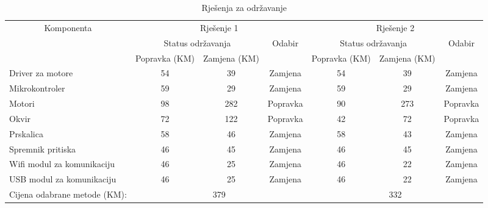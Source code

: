 \documentclass[12pt]{article}
\begin{document}
\begin{landscape}
\begin{table}[htbp]
  \centering
  \footnotesize
  \caption{Rješenja za održavanje}
    \begin{tabular}{lcccccc}
    \toprule
    \multicolumn{1}{c}{\multirow{3}[6]{*}{Komponenta}} & \multicolumn{3}{c}{Rješenje 1} & \multicolumn{3}{c}{Rješenje 2} \\
\cmidrule{2-7}          & \multicolumn{2}{c}{Status održavanja} & \multirow{2}[4]{*}{Odabir} & \multicolumn{2}{c}{Status održavanja} & \multirow{2}[4]{*}{Odabir} \\
\cmidrule{2-3}\cmidrule{5-6}          & Popravka (KM) & Zamjena (KM) &       & Popravka (KM) & Zamjena (KM) &  \\
    \midrule
    Driver za motore & 54    & 39    & Zamjena & 54    & 39    & Zamjena \\
    Mikrokontroler & 59    & 29    & Zamjena & 59    & 29    & Zamjena \\
    \midrule
    Motori & 98    & 282   & Popravka & 90    & 273   & Popravka \\
    Okvir & 72    & 122   & Popravka & 42    & 72    & Popravka \\
    Prskalica & 58    & 46    & Zamjena & 58    & 43    & Zamjena \\
    Spremnik pritiska & 46    & 45    & Zamjena & 46    & 45    & Zamjena \\
    \midrule
    Wifi modul za komunikaciju & 46    & 25    & Zamjena & 46    & 22    & Zamjena \\
    USB modul za komunikaciju & 46    & 25    & Zamjena & 46    & 22    & Zamjena \\
    \midrule
    Cijena odabrane metode (KM): & \multicolumn{3}{c}{379} & \multicolumn{3}{c}{332} \\
    \bottomrule
    \end{tabular}%
    

\end{table}
\end{landscape}
\end{document}
